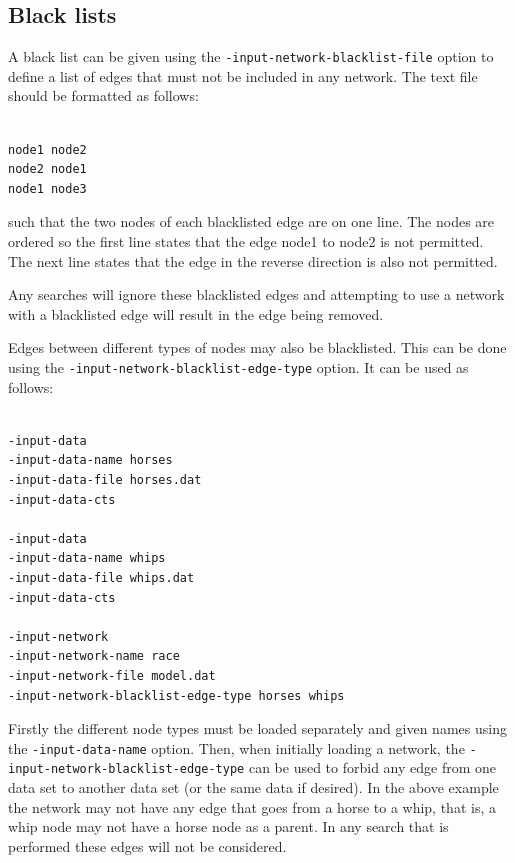 \documentclass[a4paper,12pt]{article}
\newcommand{\code}[1]{{\footnotesize{{\tt #1}}}}
\begin{document}

\subsection{Black lists}
\label{input-network-black}

A black list can be given using the \code{-input-network-blacklist-file} option to define a list of edges that must not be included in any network. The text file should be formatted as follows: 
\vspace{0.35cm} \begin{lstlisting}

node1 node2
node2 node1
node1 node3

\end{lstlisting} \vspace{0.35cm}
such that the two nodes of each blacklisted edge are on one line. The nodes are ordered so the first line states that the edge node1 to node2 is not permitted. The next line states that the edge in the reverse direction is also not permitted. 

Any searches will ignore these blacklisted edges and attempting to use a network with a blacklisted edge will result in the edge being removed. 

Edges between different types of nodes may also be blacklisted. This can be done using the \code{-input-network-blacklist-edge-type} option. It can be used as follows: 
\vspace{0.35cm} \begin{lstlisting}

-input-data
-input-data-name horses
-input-data-file horses.dat
-input-data-cts

-input-data
-input-data-name whips
-input-data-file whips.dat
-input-data-cts

-input-network
-input-network-name race
-input-network-file model.dat
-input-network-blacklist-edge-type horses whips 

\end{lstlisting} \vspace{0.35cm}
Firstly the different node types must be loaded separately and given names using the \code{-input-data-name} option. Then, when initially loading a network, the \code{-input-network-blacklist-edge-type} can be used to forbid any edge from one data set to another data set (or the same data if desired). In the above example the network may not have any edge that goes from a horse to a whip, that is, a whip node may not have a horse node as a parent. In any search that is performed these edges will not be considered. 
\end{document}
